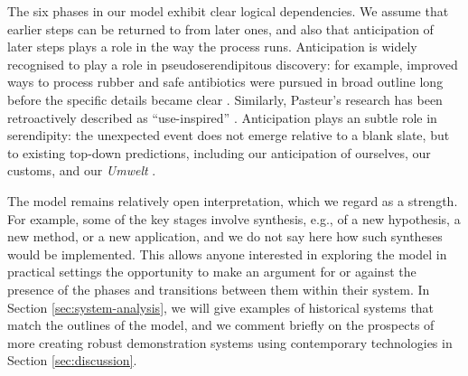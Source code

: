 The six phases in our model exhibit clear logical dependencies.%
We assume that earlier steps can be returned to from later ones, and
also that anticipation of later steps plays a role in the way the
process runs.  Anticipation is widely recognised to play a role in
pseudoserendipitous discovery: for example, improved ways to process
rubber and safe antibiotics were pursued in broad outline long before
the specific details became clear \cite{fleming,goodyear1855gum}.
Similarly, Pasteur's research has been retroactively described as
``use-inspired'' \cite{stokes1997pasteur}.  Anticipation plays an
subtle role in serendipity: the unexpected event does not emerge
relative to a blank slate, but to existing top-down predictions,
including our anticipation of ourselves, our customs, and our
\emph{Umwelt} \cite{dennett_2013}.

The model remains relatively open interpretation, which we regard as a
strength.  For example, some of the key stages involve synthesis,
e.g., of a new hypothesis, a new method, or a new application, and we
do not say here how such syntheses would be implemented.  This allows
anyone interested in exploring the model in practical settings the
opportunity to make an argument for
or against the presence of the phases and transitions between them
within their system.  In Section \ref{sec:system-analysis}, we will
give examples of historical systems that match the outlines of the
model, and we comment briefly on the prospects of more creating robust
demonstration systems using contemporary technologies in Section
\ref{sec:discussion}.





